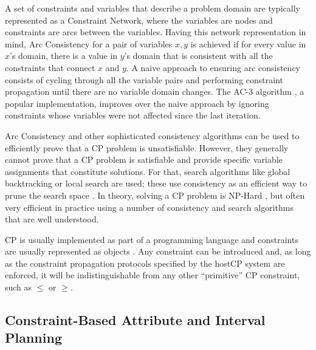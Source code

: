 A set of constraints and variables that describe a problem domain are
typically represented as a Constraint Network, where the variables are
nodes and constraints are arcs between the variables. Having this
network representation in mind, Arc Consistency  for a pair of variables $x,y$ is achieved if for every
value in $x$'s domain, there is a value in $y$'s domain that is
consistent with all the constraints that connect $x$ and $y$.  A naive
approach to ensuring arc consistency consists of cycling through all
the variable pairs and performing constraint propagation until there
are no variable domain changes. The AC-3 algorithm \cite{mackworth77},
a popular implementation, improves over the naive approach by ignoring
constraints whose variables were not affected since the last
iteration. 

Arc Consistency and other sophisticated consistency algorithms can be
used to efficiently prove that a CP problem is unsatisfiable. However,
they generally cannot prove that a CP problem is satisfiable and
provide specific variable assignments that constitute solutions. For
that, search algorithms like global backtracking  or local search are used; these use consistency as an
efficient way to prune the search space . In theory, solving a CP problem is NP-Hard
\cite{ghallab04}, but often very efficient in practice using a number
of consistency and search algorithms that are well understood.

CP is usually implemented as part of a programming language and
constraints are usually represented as objects \cite{puget95}. Any
constraint can be introduced and, as long as the constraint
propagation protocols specified by the hostCP system are enforced, it
will be indistinguishable from any other ``primitive'' CP constraint,
such as $\leq$ or $\geq$.

\subsection{Constraint-Based Attribute and Interval Planning}
\label{sec:europa:cp}


